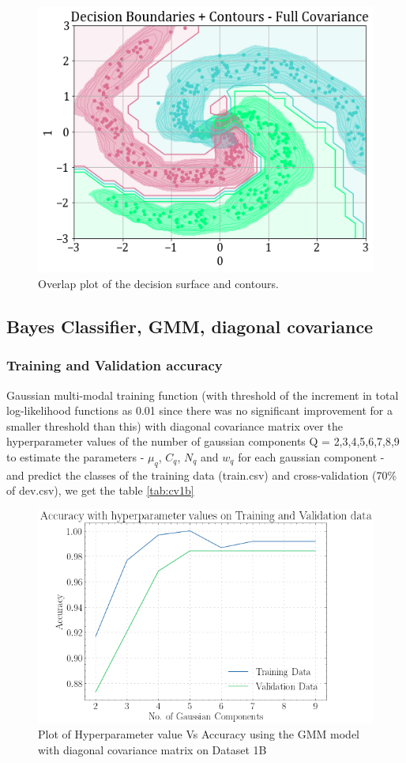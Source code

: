 \documentclass[11pt,a4paper]{article}
\begin{document}
\begin{figure}[H]
    \centering
    \includegraphics[scale=0.45]{images/1b_full_ds_contours.png}
    \caption{Overlap plot of the decision surface and contours.}
\end{figure}
\subsection{Bayes Classifier, GMM, diagonal covariance}
\subsubsection{Training and Validation accuracy}
Gaussian multi-modal training function (with threshold of the increment in total log-likelihood functions as 0.01 since there was no significant improvement for a smaller threshold than this) with diagonal covariance matrix over the hyperparameter values of the number of gaussian components Q = {2,3,4,5,6,7,8,9} to estimate the parameters - $\mu_q$, $C_q$, $N_q$ and $w_q$ for each gaussian component - and predict the classes of the training data (train.csv) and cross-validation (70\% of dev.csv), we get the table \ref{tab:cv1b}

\begin{figure}[H]
    \centering
    \includegraphics[scale=0.5]{images/acc_1b.png}
    \caption{Plot of Hyperparameter value Vs Accuracy using the GMM model with diagonal covariance matrix on Dataset 1B}
    \label{fig:acc1bGMMdiag}
\end{figure}
\end{document}
